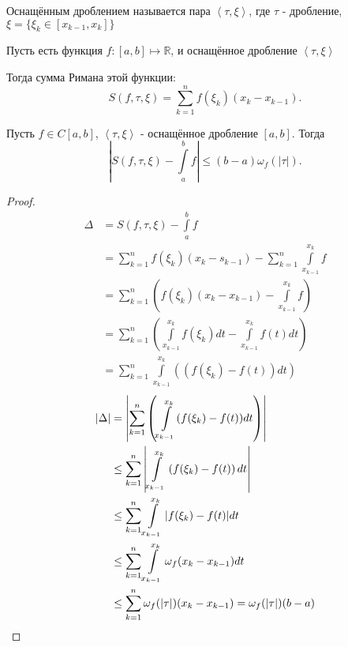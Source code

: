 \begin{definition} \thmslashn

    Оснащённым дроблением называется пара $\left<\tau, \xi\right>$, где $\tau$ - дробление, $\xi = \{\xi_{k}\in \left[x_{k-1}, x_k\right]\} $
\end{definition}
\begin{definition} \thmslashn

    Пусть есть функция $f : [a, b] \mapsto \mathbb{R}$, и оснащённое дробление $\left<\tau, \xi\right>$

    Тогда сумма Римана этой функции:
    \[ S(f, \tau, \xi) = \sum\limits_{k=1}^{n} f(\xi_k)(x_{k}-x_{k-1}) .\] 
\end{definition}
\begin{theorem} \thmslashn

    Пусть $f\in C\left[a, b\right]$, $\left<\tau, \xi\right>$ - оснащённое дробление $\left[a, b\right]$. Тогда 
    \[ \left|S(f, \tau, \xi) - \int\limits_{a}^{b} f\right| \le (b-a)\omega_{f}(|\tau|) .\]
    \begin{proof}
        \begin{equation*}
            \begin{split}
                \Delta 
                &= S(f, \tau, \xi) - \int\limits_{a}^{b} f\\
                &= \sum\limits_{k=1}^{n} f(\xi_k)(x_{k}-s_{k-1}) 
                - \sum\limits_{k=1}^{n} \int\limits_{x_{k-1}}^{x_{k}} f\\
                &= \sum\limits_{k=1}^{n} \left( f(\xi_{k})(x_{k}-x_{k-1}) 
                - \int\limits_{x_{k-1}}^{x_{k}} f   \right)\\
                &= \sum\limits_{k=1}^{n} \left( \int\limits_{x_{k-1}}^{x_{k}} f(\xi_{k})dt 
                - \int\limits_{x_{k-1}}^{x_{k}} f(t)dt    \right)\\
                &= \sum\limits_{k=1}^{n} \int\limits_{x_{k-1}}^{x_k} \left( (f(\xi_{k}) - f(t))dt\right)  
            \end{split}
        \end{equation*}
        \begin{equation*}
            \begin{split}
                |\Delta|
                &= \left|\sum\limits_{k=1}^{n} \left( \int\limits_{x_{k-1}}^{x_k} (f(\xi_{k})-f(t))dt  \right)\right|\\
                &\le \sum\limits_{k=1}^{n} \left| \int\limits_{x_{k-1}}^{x_{k}} \left( f(\xi_{k})-f(t) \right) dt\right|\\
                & \le \sum\limits_{k=1}^{n} \int\limits_{x_{k-1}}^{x_k} |f(\xi_k) - f(t)|dt\\
                & \le \sum\limits_{k=1}^{n} \int\limits_{x_{k-1}}^{x_{k}} \omega_{f}(x_{k}-x_{k-1})dt\\
                & \le  \sum\limits_{k=1}^{n} \omega_{f}(|\tau|)(x_{k} - x_{k-1}) = \omega_{f}(|\tau|)(b-a) \qedhere
            \end{split}
        \end{equation*}
    \end{proof}
\end{theorem}
